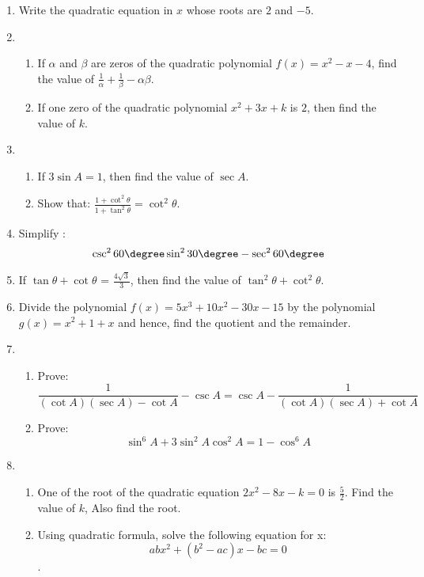 \begin{enumerate}
 \item Write the quadratic equation in $x$ whose roots are $2$ and $-5$.
        \item 
        \begin{enumerate}
                \item If $\alpha$ and $\beta$ are zeros of the quadratic polynomial $f(x) = x^2 - x - 4$, find the value of $\frac{1}{\alpha} + \frac{1}{\beta} - {\alpha \beta}$.
                \item If one zero of the quadratic polynomial $x^{2} + 3x + k$ is $2$, then find the value of $k$.
        \end{enumerate}
        \item 
        \begin{enumerate}
                \item If $3\sin A = 1$, then find the value of $\sec A$.
                \item Show that: $\frac{1 + \cot^2{\theta}}{1 + \tan^2{\theta}} = \cot^2{\theta}$.
        \end{enumerate}
\item Simplify :$${\csc^{2}{60\degree} \sin^{2}{30\degree} - \sec^{2}{60\degree}}$$
        \item If $\tan{\theta} + \cot{\theta}$ = $\frac{4 \sqrt{3}}{3}$, then find the value of $\tan^{2}{\theta} + \cot^{2}{\theta}$.
        \item Divide the polynomial $f(x) = 5x^{3} + 10x^{2} - 30{x} - 15$ by the polynomial $g(x) = x^{2} + 1 + x$ and hence, find the quotient and the remainder.
        \item
        \begin{enumerate}
                \item Prove:$$\frac{1}{(\cot A)(\sec A) - \cot A} - \csc A = \csc A - \frac{1}{(\cot A)(\sec A) + \cot A}$$
                \item Prove:$$\sin^{6} A + 3\sin^{2} A \cos^{2} A = 1 - \cos^{6}  A$$
        \end{enumerate}
        \item
        \begin{enumerate}
                \item One of the root of the quadratic equation $2x^{2} - 8x - k = 0$ is $\frac{5}{2}$. Find the value of $k$, Also find the root.
                \item Using quadratic formula, solve the following equation for x:$$abx^{2} + (b^{2} - ac)x - bc = 0$$.
        \end{enumerate}

\end{enumerate}
